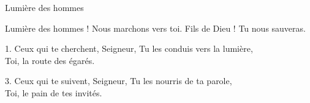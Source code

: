 Lumière des hommes

Lumière des hommes ! Nous marchons vers toi.
Fils de Dieu ! Tu nous sauveras.

1. Ceux qui te cherchent, Seigneur, Tu les conduis vers la lumière,\\
Toi, la route des égarés.

3. Ceux qui te suivent, Seigneur, Tu les nourris de ta parole,\\
Toi, le pain de tes invités.

